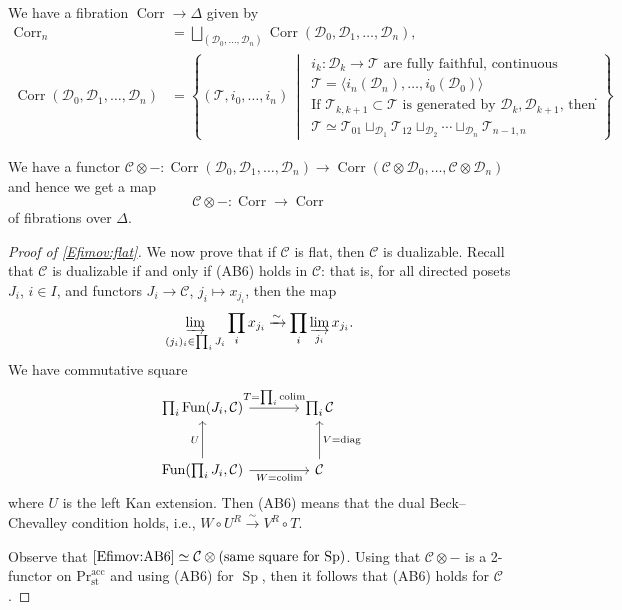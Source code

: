 \documentclass[draft]{amsart}
\newcommand{\set}[2]{\left\{#1\,\middle|\,#2\right\}}
\newcommand{\cat}[1]{\mathcal{#1}}
\newcommand{\isoto}{\mathbin{\xrightarrow{\sim}}}
\renewcommand{\Pr}{\mathrm{Pr}}
\newcommand{\blank}{-} %
\DeclareMathOperator{\Sp}{Sp}
\DeclareMathOperator{\Fun}{Fun}
\DeclareMathOperator{\Corr}{Corr}
\DeclareMathOperator*{\colim}{colim}
\theoremstyle{definition}
\begin{document}
We have a fibration $\Corr \to \Delta$ given by
\begin{align*}
\Corr_n &= \bigsqcup_{(\cat D_0,\dotsc, \cat D_n)} \Corr(\cat D_0, \cat D_1,\dotsc,\cat D_n), \\
\Corr(\cat D_0,\cat D_1,\dotsc,\cat D_n) &= \set{(\cat T, i_0,\dotsc,i_n)}{\begin{array}{l}
\text{$i_k\colon \cat D_k\to \cat T$ are fully faithful, continuous} \\
\text{$\cat T = \langle i_n(\cat D_n), \dotsc, i_0(\cat D_0)\rangle$} \\
\text{If $\cat T_{k,k+1} \subset \cat T$ is generated by $\cat D_k, \cat D_{k+1}$, then} \\
\cat T \simeq \cat T_{01} \sqcup_{\cat D_1} \cat T_{12} \sqcup_{\cat D_2} \dotsb \sqcup_{\cat D_n} \cat T_{n-1,n}
\end{array}}.
\end{align*}

We have a functor $\cat C\otimes \blank \colon \Corr(\cat D_0,\cat D_1,\dotsc, \cat D_n) \to \Corr(\cat C\otimes \cat D_0,\dotsc, \cat C\otimes \cat D_n)$ and hence we get a map
\[
\cat C\otimes\blank \colon \Corr \to \Corr
\]
of fibrations over $\Delta$.

\begin{proof}[Proof of \cref{Efimov:flat}]
We now prove that if $\cat C$ is flat, then $\cat C$ is dualizable. Recall that $\cat C$ is dualizable if and only if (AB6) holds in $\cat C$: that is, for all directed posets $J_i$, $i\in I$, and functors $J_i \to \cat C$, $j_i\mapsto x_{j_i}$, then the map
\[
\varinjlim\limits_{(j_i)_i \in \prod_i J_i} \prod_i x_{j_i} \isoto \prod_i \varinjlim\limits_{j_i} x_{j_i}.
\]
We have commutative square
\begin{equation}\label{Efimov:AB6}
\begin{tikzcd}[sep = large]
\prod_i \Fun(J_i, \cat C) \ar[r,"T = \prod_i \colim"] & \prod_i \cat C \\
\Fun(\prod_i J_i, \cat C) \ar[r, "W = \colim"'] \ar[u, "U"] & \cat C \ar[u, "V = \text{diag}"']
\end{tikzcd}
\end{equation}
where $U$ is the left Kan extension. Then (AB6) means that the dual Beck--Chevalley condition holds, i.e., $W\circ U^R \isoto V^R\circ T$.

Observe that $\eqref{Efimov:AB6} \simeq \cat C\otimes (\text{same square for $\Sp$})$. Using that $\cat C\otimes \blank$ is a 2-functor on $\Pr^{\mathrm{acc}}_{\mathrm{st}}$ and using (AB6) for $\Sp$, then it follows that (AB6) holds for $\cat C$.
\end{proof}
\end{document}
